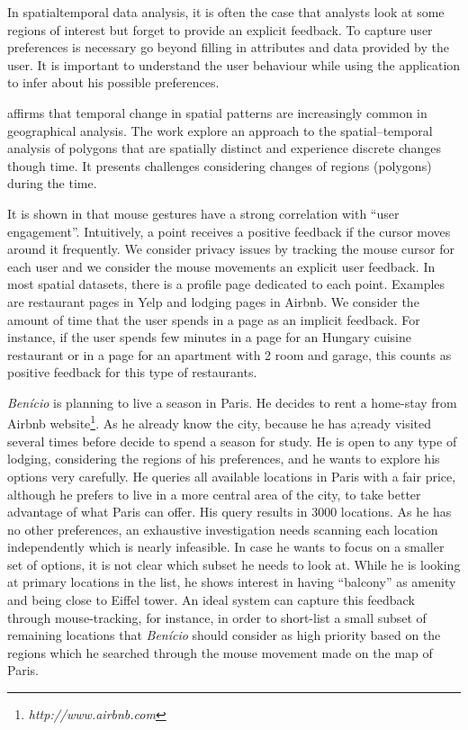 \documentclass[runningheads,a4paper]{llncs}
\begin{document}
In spatialtemporal data analysis, it is often the case that analysts look at some regions of interest but forget to provide an explicit feedback. To capture user preferences is necessary go beyond filling in attributes and data provided by the user. It is important to understand the user behaviour while using the application to infer about his possible preferences.

\cite{Robertson2007}  affirms that temporal change in spatial patterns are increasingly common in geographical analysis. The work explore an approach to the spatial–temporal analysis of polygons that are spatially distinct and experience discrete changes though time. It presents challenges considering changes of regions (polygons) during the time.

It is shown in \cite{arapakis2014understanding} that mouse gestures have a strong correlation with ``user engagement''. Intuitively, a point receives a positive feedback if the cursor moves around it frequently. We consider privacy issues by tracking the mouse cursor for each user and we consider the mouse movements an explicit user feedback. In most spatial datasets, there is a profile page dedicated to each point. Examples are restaurant pages in Yelp and lodging pages in Airbnb. We consider the amount of time that the user spends in a page as an implicit feedback. For instance, if the user spends few minutes in a page for an Hungary cuisine restaurant or in a page for an apartment with 2 room and garage, this counts as positive feedback for this type of restaurants.

\begin{example}
\label{ex:benicio}
\textit{Ben\'icio} is planning to live a season in Paris. He decides to rent a home-stay from Airbnb website\footnote{\it http://www.airbnb.com}. As he already know the city, because he has a;ready visited several times before decide to spend a season for study. He is open to any type of lodging, considering the regions of his preferences, and he wants to explore his options very carefully. He queries all available locations in Paris with a fair price, although he prefers to live in a more central area of the city, to take better advantage of what Paris can offer. His query results in 3000 locations. As he has no other preferences, an exhaustive investigation needs scanning each location independently which is nearly infeasible. In case he wants to focus on a smaller set of options, it is not clear which subset he needs to look at. While he is looking at primary locations in the list, he shows interest in having ``balcony'' as amenity and being close to Eiffel tower. An ideal system can capture this feedback through mouse-tracking, for instance, in order to short-list a small subset of remaining locations that \textit{Ben\'icio} should consider as high priority based on the regions  which he searched through the mouse movement made on the map of Paris. 
\end{example}
\end{document}
